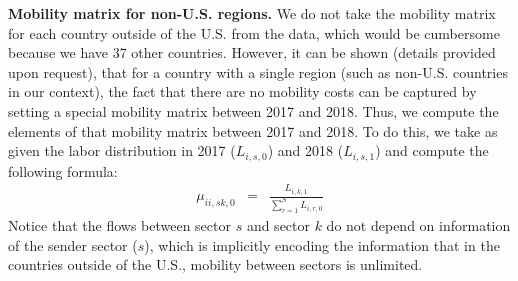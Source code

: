 \documentclass[12pt]{article}
\newcommand{\bs}{\small \begin{eqnarray*}}
\newcommand{\es}{\end{eqnarray*}}
\begin{document}
\textbf{Mobility matrix for non-U.S. regions.} We do not take the mobility matrix for each country outside of the U.S. from the data, which would be cumbersome because we have 37 other countries. However, it can be shown (details provided upon request), that for a country with a single region (such as non-U.S. countries in our context), the fact that there are no mobility costs can be captured by setting a special mobility matrix between 2017 and 2018. Thus, we compute the elements of that mobility matrix between 2017 and 2018. To do this, we take as given the labor distribution in 2017 ($L_{i,s,0}$) and 2018 ($L_{i,s,1}$) and compute the following formula:
\bs
\mu_{ii,sk,0} & = & \frac{L_{i,k,1}}{\sum_{r=1}^S L_{i,r,0}}
\es
Notice that the flows between sector $s$ and sector $k$ do not depend on information of the sender sector ($s$), which is implicitly encoding the information that in the countries outside of the U.S., mobility between sectors is unlimited.
\end{document}
